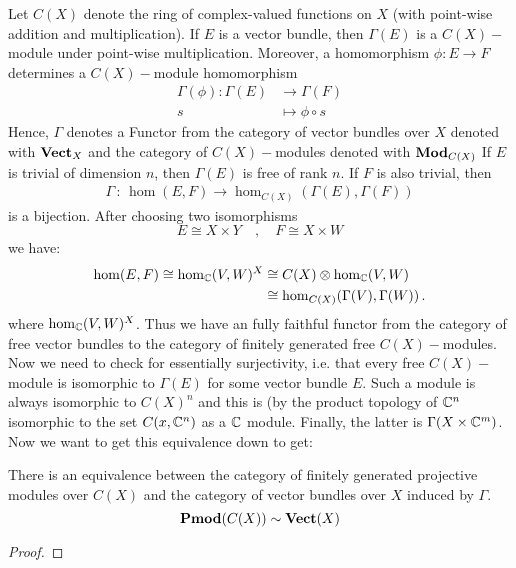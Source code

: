 \begin{remark}
	Let $C(X)$ denote the ring of complex-valued functions on $X$ (with point-wise addition and multiplication). If $E$ is a vector bundle, then $\Gamma(E)$ is a $C(X)-$module under point-wise multiplication.
	Moreover, a homomorphism $\phi:E\to F$ determines a $C(X)-$module homomorphism
	\begin{align*}
		\Gamma(\phi): \Gamma(E) &\to \Gamma(F) \\
		s                       & \mapsto \phi\circ s
	\end{align*}
	Hence, $\Gamma$ denotes a Functor from the category of vector bundles over $X$ denoted with $\operatorname{\mathbf{Vect}}_X$ and the category of $C(X)-$modules denoted with $\operatorname{\mathbf{Mod}}_{C(X)}$
	If $E$ is trivial of dimension $n$, then $\Gamma(E)$ is free of rank $n$. If $F$ is also trivial, then
	\begin{align*}
		\Gamma \, : \, \hom(E,F) \to \hom_{C(X)}(\Gamma(E),\Gamma(F))
	\end{align*} is a bijection. After choosing two isomorphisms
	\begin{equation*}
		E\cong X\times Y \quad,\quad F\cong X\times W
	\end{equation*} we have:
	\begin{align*}
		\hom(E,F)\cong \hom_{\mathbb{C}}(V,W)^X & \cong C(X)\otimes \hom_{\mathbb{C}}(V,W)\, \\
		& \cong \hom_{C(X)}(\Gamma(V),\Gamma(W))\, .
	\end{align*} where $\hom_{\mathbb{C}}(V,W)^X$. Thus we have an fully faithful functor from the category of free vector bundles to the category of finitely generated free $C(X)-$modules. Now we need to check for essentially surjectivity, i.e. that every free $C(X)-$module is isomorphic to $\Gamma(E)$ for some vector bundle $E$. Such a module is always isomorphic to $C(X)^n$ and this is (by the product topology of $\mathbb{C}^n$ isomorphic to the set $C(x,\mathbb{C}^n)$ as a $\mathbb{C}$ module. Finally, the latter is $\Gamma(X\times \mathbb{C}^m)$. Now we want to get this equivalence down to get:
\end{remark}
\begin{theorem}
	There is an equivalence between the category of finitely generated projective modules over $C(X)$ and the category of vector bundles over $X$ induced by $\Gamma$.
	\begin{equation*}
		\operatorname{\mathbf{Pmod}}(C(X))\sim \operatorname{\mathbf{Vect}}(X)
	\end{equation*}
\end{theorem}
\begin{proof}
\end{proof}
